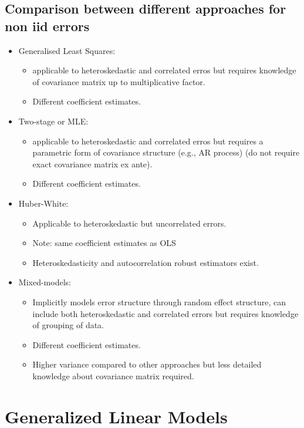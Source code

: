 \documentclass[11pt, %
	oneside, %
	english, %
	onehalfspacing, %
	]{article} %
\numberwithin{equation}{section}
\begin{document}
\subsection{Comparison between different approaches for non iid errors}

\begin{itemize}
    \item Generalised Least Squares:
    \begin{itemize}
        \item applicable to heteroskedastic and correlated erros but requires knowledge of covariance matrix up to multiplicative factor.
        \item Different coefficient estimates.
    \end{itemize}
    \item Two-stage or MLE:
    \begin{itemize}
        \item applicable to heteroskedastic and correlated erros but requires a parametric form of covariance structure (e.g., AR process) (do not require exact covariance matrix ex ante).
        \item Different coefficient estimates.
    \end{itemize}
    \item Huber-White:
    \begin{itemize}
        \item Applicable to heteroskedastic but uncorrelated errors.
        \item Note: same coefficient estimates as OLS
        \item Heteroskedasticity and autocorrelation robust estimators exist.
    \end{itemize}
    \item Mixed-models:
    \begin{itemize}
        \item Implicitly models error structure through random effect structure, can include both heteroskedastic and correlated errors but requires knowledge of grouping of data.
        \item Different coefficient estimates.
        \item Higher variance compared to other approaches but less detailed knowledge about covariance matrix required.
    \end{itemize}
\end{itemize}


\clearpage


\section{Generalized Linear Models}
\end{document}
